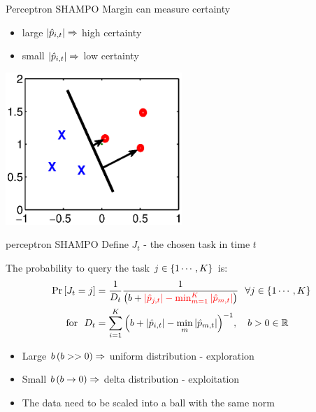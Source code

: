\documentclass{beamer}
\begin{document}
\begin{frame}{Perceptron SHAMPO }
Margin can measure certainty \newline
\begin{itemize}
\item large $\left\vert{\hat{p}_{i,t}}\right\vert\Rightarrow$ high certainty\newline
\item small $\left\vert{\hat{p}_{i,t}}\right\vert\Rightarrow$ low certainty
\end{itemize}
\begin{center}
\includegraphics[width=0.5\textwidth]{figs/margin.eps}
\end{center}
\end{frame}

\begin{frame}{perceptron SHAMPO }
Define $J_t$ - the chosen task in time $t$\newline

The probability to query the task $j\in\left\{{1\cdots,K}\right\}$ is:\newline
\begin{equation*}
\begin{aligned}
 {\rm Pr}\left[{J_t=j}\right]&=\frac{1}{D_t}\frac{1}{\left({b+\textcolor{red}{\left\vert{\hat{p}_{j,t}}\right\vert-\min_{m=1}^K\left\vert{\hat{p}_{m,t}}\right\vert}}\right)} ~~\forall j\in\left\{{1\cdots,K}\right\}\\
~ \textrm{ for }~
D_{t}&=\sum_{i=1}^{K}{\left({b+\left\vert{\hat{p}_{i,t}}\right\vert-\min_{m}\left\vert{\hat{p}_{m,t}}\right\vert}\right)^{-1}},~~~  b>0\in\mathbb{R}
\end{aligned}
\end{equation*}
\begin{itemize}
\item Large $b \left({b >> 0 }\right)\Rightarrow$ uniform distribution - exploration \newline
\item Small $b\left({b\rightarrow 0 }\right) \Rightarrow$ delta distribution - exploitation\newline
\item The data need to be  scaled into a ball with the same norm
\end{itemize}
\end{frame}
\end{document}
